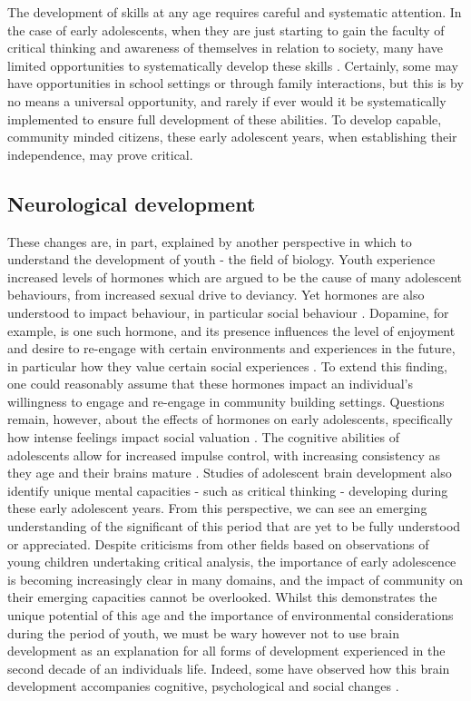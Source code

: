 The development of skills at any age requires careful and systematic attention. In the case of early adolescents, when they are just starting to gain the faculty of critical thinking and awareness of themselves in relation to society, many have limited opportunities to systematically develop these skills \citep{ForrestBank2015}. Certainly, some may have opportunities in school settings or through family interactions, but this is by no means a universal opportunity, and rarely if ever would it be systematically implemented to ensure full development of these abilities. To develop capable, community minded citizens, these early adolescent years, when establishing their independence, may prove critical. 

\subsection{Neurological development}

\label{Neuro} 
These changes are, in part, explained by another perspective in which to understand the development of youth - the field of biology. Youth experience increased levels of hormones which are argued to be the cause of many adolescent behaviours, from increased sexual drive to deviancy. Yet hormones are also understood to impact behaviour, in particular social behaviour \citep{NationalInstituteofMentalHealth2011}. Dopamine, for example, is one such hormone, and its presence influences the level of enjoyment and desire to re-engage with certain environments and experiences in the future, in particular how they value certain social experiences \citep{Crone2012}. To extend this finding, one could reasonably assume that these hormones impact an individual's willingness to engage and re-engage in community building settings. Questions remain, however, about the effects of hormones on early adolescents, specifically how intense feelings impact social valuation \citep{Crone2012}. The cognitive abilities of adolescents allow for increased impulse control, with increasing consistency as they age and their brains mature \citep{Johnson2009}. Studies of adolescent brain development also identify unique mental capacities - such as critical thinking - developing during these early adolescent years. From this perspective, we can see an emerging understanding of the significant of this period that are yet to be fully understood or appreciated. Despite criticisms from other fields based on observations of young children undertaking critical analysis, the importance of early adolescence is becoming increasingly clear in many domains, and the impact of community on their emerging capacities cannot be overlooked. Whilst this demonstrates the unique potential of this age and the importance of environmental considerations during the period of youth, we must be wary however not to use brain development as an explanation for all forms of development experienced in the second decade of an individuals life. Indeed, some have observed how this brain development accompanies cognitive, psychological and social changes \citep{Kuhn2006, Wyn2011a,Cote2002}. 


